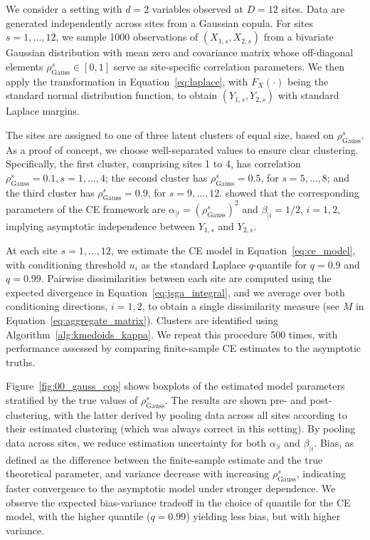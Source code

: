 \documentclass[preprint,12pt,authoryear]{elsarticle}
\begin{document}
We consider a setting with $d=2$ variables observed at $D=12$ sites. 
Data are generated independently across sites from a Gaussian copula. 
For sites $s = {1, \ldots, 12}$, we sample 1000 observations of $(X_{1,s}, X_{2,s})$ from a bivariate Gaussian distribution with mean zero and covariance matrix whose off-diagonal elements $\rho^s_{\text{Gauss}} \in [0, 1]$ serve as site-specific correlation parameters.
We then apply the transformation in Equation~\eqref{eq:laplace}, with $F_X(\cdot)$ being the standard normal distribution function, to obtain $(Y_{1,s}, Y_{2,s})$ with standard Laplace margins.

The sites are assigned to one of three latent clusters of equal size, based on $\rho^s_{\text{Gauss}}$.
As a proof of concept, we choose well-separated values to ensure clear clustering.
Specifically, the first cluster, comprising sites 1 to 4, has correlation $\rho_{\text{Gauss}}^s=0.1, s = 1, \ldots, 4$; the second cluster has $\rho_{\text{Gauss}}^s=0.5$, for $s = 5, \ldots, 8$; and the third cluster has $\rho_{\text{Gauss}}^s=0.9$, for $s = 9, \ldots, 12$.
\citet{Keef2013} showed that the corresponding parameters of the CE framework are $\alpha_{\mid i} = (\rho_{\text{Gauss}}^s)^2$ and $\beta_{\mid i} = 1/2$, $i=1,2$, implying asymptotic independence between $Y_{1,s}$ and $Y_{2,s}$.

At each site $s = 1, \ldots, 12$, we estimate the CE model in Equation~\eqref{eq:ce_model}, with conditioning threshold $u_{i}$ as the standard Laplace $q$-quantile for \(q=0.9\) and \(q=0.99\).
Pairwise dissimilarities between each site are computed using the expected divergence in Equation~\eqref{eq:jsga_integral}, and we average over both conditioning directions, $i = 1, 2$, to obtain a single dissimilarity measure (see $M$ in Equation~\eqref{eq:aggregate_matrix}).
Clusters are identified using Algorithm~\ref{alg:kmedoids_kappa}.
We repeat this procedure 500 times, with performance assessed by comparing finite-sample CE estimates to the asymptotic truths. 

Figure~\ref{fig:00_gauss_cop} shows boxplots of the estimated model parameters stratified by the true values of $\rho_{\text{Gauss}}^s$.
The results are shown pre- and post-clustering, with the latter derived by pooling data across all sites according to their estimated clustering (which was always correct in this setting).
By pooling data across sites, we reduce estimation uncertainty for both $\alpha_{\mid i}$ and $\beta_{\mid i}$.
Bias, as defined as the difference between the finite-sample estimate and the true theoretical parameter, and variance decrease with increasing $\rho_{\text{Gauss}}^s$, indicating faster convergence to the asymptotic model under stronger dependence. 
We observe the expected bias-variance tradeoff in the choice of quantile for the CE model, with the higher quantile ($q=0.99$) yielding less bias, but with higher variance.
\end{document}
